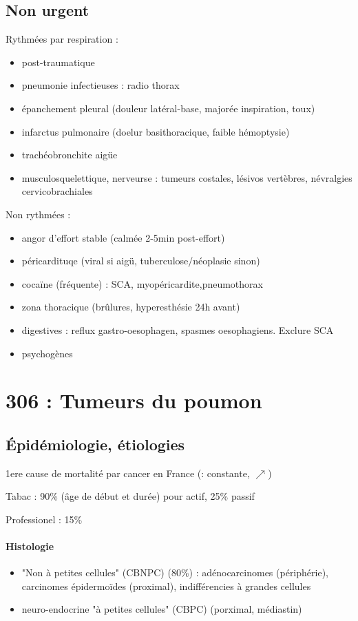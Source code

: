 \documentclass{article}
\begin{document}
\subsection{Non urgent}
Rythmées par respiration :
\begin{itemize}
  \item post-traumatique
  \item pneumonie infectieuses : radio thorax
  \item épanchement pleural (douleur latéral-base, majorée inspiration, toux)
  \item infarctus pulmonaire (doelur basithoracique, faible hémoptysie)
  \item trachéobronchite aigüe
  \item musculosquelettique, nerveurse : tumeurs costales, lésivos vertèbres,
    névralgies cervicobrachiales
\end{itemize}
Non rythmées :
\begin{itemize}
  \item angor d'effort stable (calmée 2-5min post-effort)
  \item péricardituqe (viral si aigü, tuberculose/néoplasie sinon)
  \item cocaïne (fréquente) : SCA, myopéricardite,pneumothorax
  \item zona thoracique (brûlures, hyperesthésie 24h avant)
  \item digestives : reflux gastro-oesophagen, spasmes oesophagiens. Exclure SCA
    \skull
  \item psychogènes
\end{itemize}

\section{306 : Tumeurs du poumon}%
\label{sec:306_tumeurs_du_poumon}

\subsection{Épidémiologie, étiologies}
1ere cause de mortalité par cancer en France (\male : constante, \female
$\nearrow$)

Tabac : 90\% (âge de début et durée) pour actif, 25\% passif

Professionel : 15\%

\paragraph{Histologie}
\begin{itemize}
  \item "Non à petites cellules" (CBNPC) (80\%) : adénocarcinomes (périphérie),
    carcinomes épidermoïdes (proximal), indifférencies à grandes cellules
  \item neuro-endocrine "à petites cellules" (CBPC) (porximal, médiastin)
\end{itemize}
\end{document}
